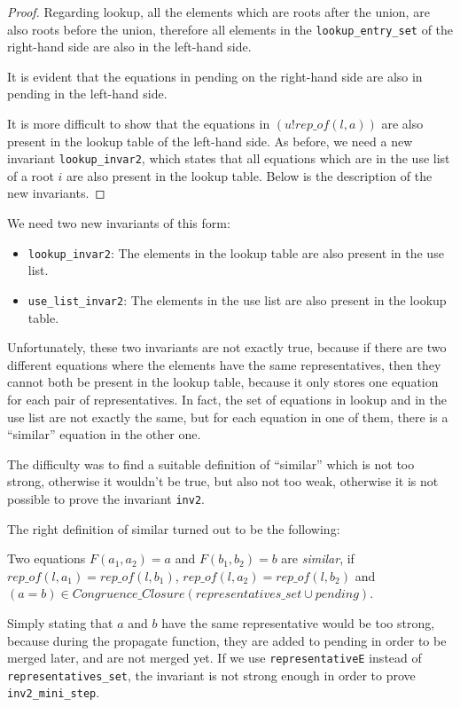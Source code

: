 \begin{proof}
Regarding lookup, all the elements which are roots after the union, are also roots before the union, therefore all elements in the \lstinline{lookup_entry_set} of the right-hand side are also in the left-hand side.

It is evident that the equations in pending on the right-hand side are also in pending in the left-hand side.

It is more difficult to show that the equations in $(u ! rep\_of(l, a))$ are also present in the lookup table of the left-hand side. As before, we need a new invariant \lstinline{lookup_invar2}, which states that all equations which are in the use list of a root $i$ are also present in the lookup table. Below is the description of the new invariants.
\end{proof}

We need two new invariants of this form:
\begin{itemize}
    \item \lstinline{lookup_invar2}: The elements in the lookup table are also present in the use list.
	\item \lstinline{use_list_invar2}: The elements in the use list are also present in the lookup table.
\end{itemize}

Unfortunately, these two invariants are not exactly true, because if there are two different equations where the elements have the same representatives, then they cannot both be present in the lookup table, because it only stores one equation for each pair of representatives. In fact, the set of equations in lookup and in the use list are not exactly the same, but for each equation in one of them, there is a ``similar'' equation in the other one.

The difficulty was to find a suitable definition of ``similar'' which is not too strong, otherwise it wouldn't be true, but also not too weak, otherwise it is not possible to prove the invariant \lstinline{inv2}.

The right definition of similar turned out to be the following:

\begin{definition}
Two equations $F(a_1, a_2) = a$ and $F(b_1, b_2) = b$ are \emph{similar}, if $rep\_of(l, a_1) = rep\_of(l, b_1)$, $rep\_of(l, a_2) = rep\_of(l, b_2)$ and $(a=b) \in Congruence\_Closure (representatives\_set \cup pending)$.
\end{definition}

Simply stating that $a$ and $b$ have the same representative would be too strong, because during the propagate function, they are added to pending in order to be merged later, and are not merged yet. If we use \lstinline{representativeE} instead of \lstinline{representatives_set}, the invariant is not strong enough in order to prove \lstinline{inv2_mini_step}.

